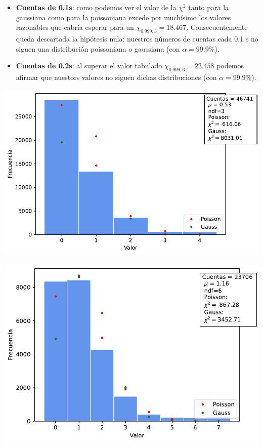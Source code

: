 \documentclass[11pt]{article}
\begin{document}
\begin{itemize}
	\item \textbf{Cuentas de 0.1s}: como podemos ver el valor de la $\chi^2$ tanto para la gaussiana como para la poissoniana excede por muchísimo los valores razonables que cabría esperar para un $\chi_{0.999,3}=18.467$. Consecuentemente queda descartada la hipótesis nula: nuestros números de cuentas cada 0.1 s no siguen una distribución poissoniana o gaussiana (con $\alpha=99.9$\%).
	\item \textbf{Cuentas de 0.2s}: al superar el valor tabulado $\chi_{0.999,6}=22.458$ podemos afirmar que nuestors valores no siguen dichas distribuciones (con $\alpha=99.9$\%).
\end{itemize}
	\begin{minipage}[t]{0.5\linewidth}
		\begin{center}
		\label{Fig:1ms}
		\includegraphics[width=1\linewidth]{../Graficas/Histo_1ms.pdf}
		\end{center}
	\end{minipage}	
	\hfill
	\begin{minipage}[t]{0.5\linewidth}
	\begin{center}
		\label{Fig:2ms}
		\includegraphics[width=1\linewidth]{../Graficas/Histo_2ms.pdf}
	\end{center}
	\end{minipage}	
	
\end{document}
